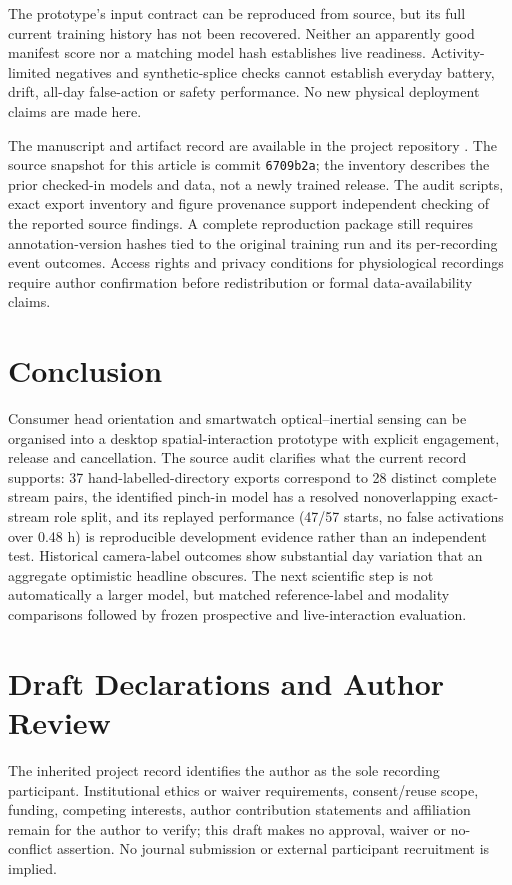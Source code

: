 The prototype's input contract can be reproduced from source, but its full current training history has not been recovered. Neither an apparently good manifest score nor a matching model hash establishes live readiness. Activity-limited negatives and synthetic-splice checks cannot establish everyday battery, drift, all-day false-action or safety performance. No new physical deployment claims are made here.

The manuscript and artifact record are available in the project repository \cite{repository}. The source snapshot for this article is commit \nolinkurl{6709b2a}; the inventory describes the prior checked-in models and data, not a newly trained release. The audit scripts, exact export inventory and figure provenance support independent checking of the reported source findings. A complete reproduction package still requires annotation-version hashes tied to the original training run and its per-recording event outcomes. Access rights and privacy conditions for physiological recordings require author confirmation before redistribution or formal data-availability claims.

\section{Conclusion}\label{conclusion}

Consumer head orientation and smartwatch optical--inertial sensing can be organised into a desktop spatial-interaction prototype with explicit engagement, release and cancellation. The source audit clarifies what the current record supports: 37 hand-labelled-directory exports correspond to 28 distinct complete stream pairs, the identified pinch-in model has a resolved nonoverlapping exact-stream role split, and its replayed performance (47/57 starts, no false activations over 0.48 h) is reproducible development evidence rather than an independent test. Historical camera-label outcomes show substantial day variation that an aggregate optimistic headline obscures. The next scientific step is not automatically a larger model, but matched reference-label and modality comparisons followed by frozen prospective and live-interaction evaluation.

\section{Draft Declarations and Author Review}\label{draft-declarations-and-author-review}

The inherited project record identifies the author as the sole recording participant. Institutional ethics or waiver requirements, consent/reuse scope, funding, competing interests, author contribution statements and affiliation remain for the author to verify; this draft makes no approval, waiver or no-conflict assertion. No journal submission or external participant recruitment is implied.

